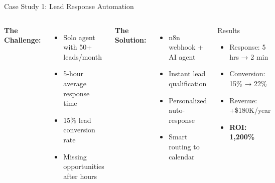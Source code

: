 \documentclass{beamer}
\begin{document}
\begin{frame}{Case Study 1: Lead Response Automation}
  \begin{columns}[onlytextwidth]
      \textbf{The Challenge:}
      \begin{itemize}
        \item Solo agent with 50+ leads/month
        \item 5-hour average response time
        \item 15\% lead conversion rate
        \item Missing opportunities after hours
      \end{itemize}
      
      \textbf{The Solution:}
      \begin{itemize}
        \item n8n webhook + AI agent
        \item Instant lead qualification
        \item Personalized auto-response
        \item Smart routing to calendar
      \end{itemize}
    
      \begin{block}{Results}
        \begin{itemize}
          \item Response: 5 hrs → 2 min
          \item Conversion: 15\% → 22\%
          \item Revenue: +\$180K/year
          \item \textbf{ROI: 1,200\%}
        \end{itemize}
      \end{block}
  \end{columns}
\end{frame}
\end{document}
